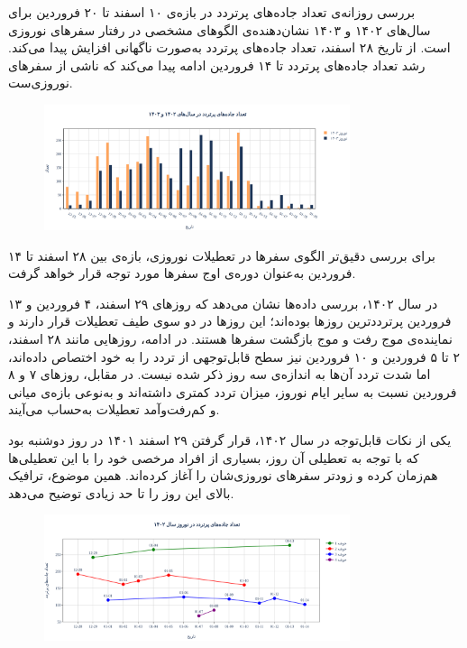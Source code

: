\documentclass[a4paper, 12pt]{article}
\begin{document}
بررسی روزانه‌ی تعداد جاده‌های پرتردد در بازه‌ی ۱۰ اسفند تا ۲۰ فروردین برای سال‌های ۱۴۰۲ و ۱۴۰۳ نشان‌دهنده‌ی الگوهای مشخصی در رفتار سفرهای نوروزی است. از تاریخ ۲۸ اسفند، تعداد جاده‌های پرتردد به‌صورت ناگهانی افزایش پیدا می‌کند. رشد تعداد جاده‌های پرتردد تا ۱۴ فروردین ادامه پیدا می‌کند که ناشی از سفرهای نوروزی‌ست.

\begin{figure}[htbp]
    \centering
    \includegraphics[width=0.8\textwidth]{peaks-pics/count_both.png}
\end{figure}

برای بررسی دقیق‌تر الگوی سفرها در تعطیلات نوروزی، بازه‌ی بین ۲۸ اسفند تا ۱۴ فروردین به‌عنوان دوره‌ی اوج سفرها مورد توجه قرار خواهد گرفت.

\medskip
 در سال ۱۴۰۲، بررسی داده‌ها نشان می‌دهد که روزهای ۲۹ اسفند، ۴ فروردین و ۱۳ فروردین پرترددترین روزها بوده‌اند؛ این روزها در دو سوی طیف تعطیلات قرار دارند و نماینده‌ی موج رفت و موج بازگشت سفرها هستند. در ادامه، روزهایی مانند ۲۸ اسفند، ۲ تا ۵ فروردین و ۱۰ فروردین نیز سطح قابل‌توجهی از تردد را به خود اختصاص داده‌اند، اما شدت تردد آن‌ها به اندازه‌ی سه روز ذکر شده نیست. در مقابل، روزهای ۷ و ۸ فروردین نسبت به سایر ایام نوروز، میزان تردد کمتری داشته‌اند و به‌نوعی بازه‌ی میانی و کم‌رفت‌وآمد تعطیلات به‌حساب می‌آیند.

\medskip    
یکی از نکات قابل‌توجه در سال ۱۴۰۲، قرار گرفتن ۲۹ اسفند ۱۴۰۱ در روز دوشنبه بود که با توجه به تعطیلی آن روز، بسیاری از افراد مرخصی خود را با این تعطیلی‌ها هم‌زمان کرده و زودتر سفرهای نوروزی‌شان را آغاز کرده‌اند. همین موضوع، ترافیک بالای این روز را تا حد زیادی توضیح می‌دهد.

\begin{figure}[htbp]
    \centering
    \includegraphics[width=0.8\textwidth]{peaks-pics/cluster1402.png}
\end{figure}
\end{document}
